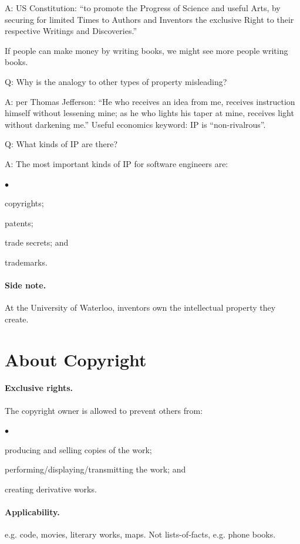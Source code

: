 \documentclass[11pt]{article}
\newcommand{\squishlist}{
 \begin{list}{$\bullet$}
  { \setlength{\itemsep}{0pt}
     \setlength{\parsep}{3pt}
     \setlength{\topsep}{3pt}
     \setlength{\partopsep}{0pt}
     \setlength{\leftmargin}{1.5em}
     \setlength{\labelwidth}{1em}
     \setlength{\labelsep}{0.5em} } }
\newcommand{\squishend}{
  \end{list}  }
\begin{document}
\noindent
A: US Constitution: ``to promote the Progress of Science and useful Arts, by securing for limited Times to Authors and Inventors the exclusive Right to their respective Writings and Discoveries.''

\noindent
If people can make money by writing books, we might see more people writing books.

\noindent
Q: Why is the analogy to other types of property misleading?

\noindent
A: per Thomas Jefferson: ``He who receives an idea from me, receives instruction himself without lessening mine; as he who lights his taper at mine, receives light without darkening me.'' Useful economics keyword: IP is ``non-rivalrous''.

\newpage
\noindent
Q: What kinds of IP are there?

\noindent
A: The most important kinds of IP for software engineers are:
\squishlist
\item copyrights;
\item patents;
\item trade secrets; and
\item trademarks.
\squishend

\paragraph{Side note.} At the University of Waterloo, inventors own the intellectual property
they create.

\section*{About Copyright}

\paragraph{Exclusive rights.} The copyright owner is allowed to prevent others from:
\squishlist
  \item producing and selling copies of the work;
  \item performing/displaying/transmitting the work; and
  \item creating derivative works.
\squishend

\paragraph{Applicability.} e.g. code, movies, literary works, maps. Not lists-of-facts,
e.g. phone books.
\end{document}
